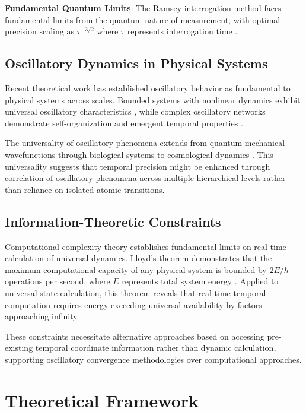 \documentclass[11pt]{article}
\theoremstyle{remark}
\begin{document}
\textbf{Fundamental Quantum Limits}: The Ramsey interrogation method faces fundamental limits from the quantum nature of measurement, with optimal precision scaling as $\tau^{-3/2}$ where $\tau$ represents interrogation time \cite{ramsey1956molecular}.

\subsection{Oscillatory Dynamics in Physical Systems}

Recent theoretical work has established oscillatory behavior as fundamental to physical systems across scales. Bounded systems with nonlinear dynamics exhibit universal oscillatory characteristics \cite{guckenheimer1983nonlinear}, while complex oscillatory networks demonstrate self-organization and emergent temporal properties \cite{pikovsky2003synchronization,acebron2005kuramoto}.

The universality of oscillatory phenomena extends from quantum mechanical wavefunctions \cite{schrodinger1926undulatory} through biological systems \cite{goldbeter1996biochemical} to cosmological dynamics \cite{weinberg2008cosmology}. This universality suggests that temporal precision might be enhanced through correlation of oscillatory phenomena across multiple hierarchical levels rather than reliance on isolated atomic transitions.

\subsection{Information-Theoretic Constraints}

Computational complexity theory establishes fundamental limits on real-time calculation of universal dynamics. Lloyd's theorem demonstrates that the maximum computational capacity of any physical system is bounded by $2E/\hbar$ operations per second, where $E$ represents total system energy \cite{lloyd2000ultimate}. Applied to universal state calculation, this theorem reveals that real-time temporal computation requires energy exceeding universal availability by factors approaching infinity.

These constraints necessitate alternative approaches based on accessing pre-existing temporal coordinate information rather than dynamic calculation, supporting oscillatory convergence methodologies over computational approaches.

\section{Theoretical Framework}
\end{document}
